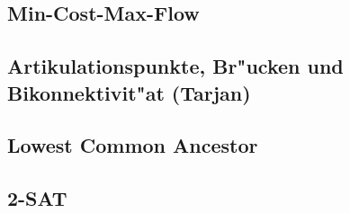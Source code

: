 \subsection{Min-Cost-Max-Flow}



\subsection{Artikulationspunkte, Br"ucken und Bikonnektivit"at (Tarjan)}



\subsection{Lowest Common Ancestor}



\subsection{2-SAT}


